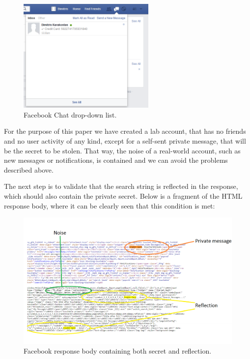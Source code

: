 \begin{figure}[H] \caption{Facebook Chat drop-down list.} \centering
\includegraphics[width=0.6\textwidth]{diagrams/fb_message.png}\end{figure}

For the purpose of this paper we have created a lab account, that has no friends
and no user activity of any kind, except for a self-sent private message, that
will be the secret to be stolen. That way, the noise of a real-world account,
such as new messages or notifications, is contained and we can avoid the
problems described above.

The next step is to validate that the search string is reflected in the
response, which should also contain the private secret. Below is a fragment of
the HTML response body, where it can be clearly seen that this condition is met:

\begin{figure}[H] \caption{Facebook response body containing both secret and
reflection.} \centering
\includegraphics[width=1.1\textwidth]{diagrams/fb_response.png}\end{figure}

